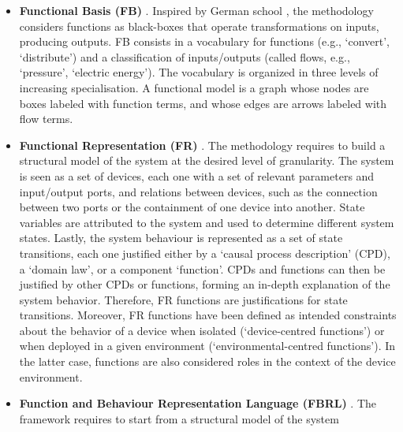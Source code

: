 \documentclass[
]{ceurart}
\begin{document}
\begin{itemize}
    \item \textbf{Functional Basis (FB)} \cite{hirtz_functional_2002}%
    . Inspired by German school \cite{pahl_engineering_2007}, the methodology considers functions as black-boxes that operate transformations on inputs, producing outputs. FB consists in a vocabulary for functions (e.g., `convert', `distribute') and a classification of inputs/outputs (called flows, e.g., `pressure', `electric energy'). The vocabulary is organized in three levels of increasing specialisation. A functional model is a graph whose nodes are boxes labeled with function terms, and whose edges are arrows labeled with %
    flow terms. %
    \item \textbf{Functional Representation (FR)} \cite{chandrasekaranFunctionalRepresentationDesign1993, chandrasekaranFunctionDeviceRepresentation2000}. The methodology requires to build a structural model of the system at the desired level of granularity. The system is seen as a set of devices, each one with a set of relevant parameters and input/output ports, and relations between devices, such as the connection between two ports or the containment of one device into another. State variables are attributed to the system and used to determine different system states. Lastly, the system behaviour is represented as a set of state transitions, each one justified either by a `causal process description' (CPD), a `domain law', or a component `function'. CPDs and functions can then be justified by other CPDs or functions, forming an in-depth explanation of the system behavior. Therefore, FR functions are justifications for state transitions. Moreover, FR functions have been defined as intended constraints about the behavior of a device when isolated (`device-centred functions') or when deployed in a given environment (`environmental-centred functions'). In the latter case, functions are also considered roles in the context of the device environment. %
    \item \textbf{Function and Behaviour Representation Language (FBRL)} \cite{sasajimaFBRLFunctionBehavior1995, kitamuraOntologicalModelDevice2006}. The framework requires to start from a structural model of the system

\end{itemize}
\end{document}

